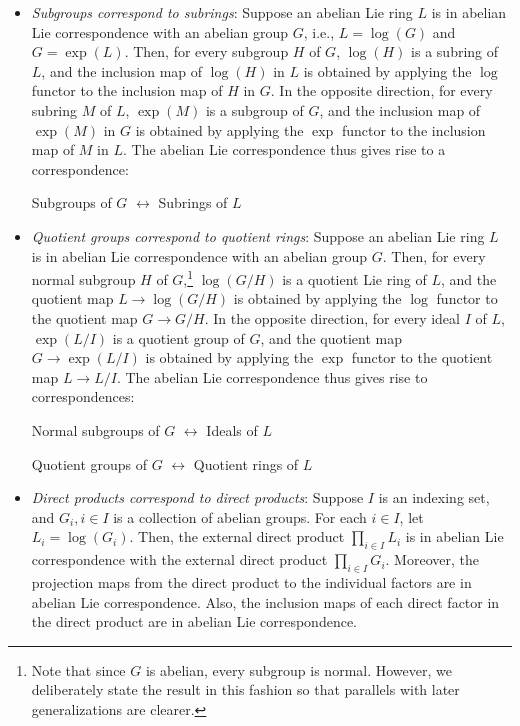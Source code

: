 \documentclass{ucetd}
\begin{document}
\begin{itemize}
\item {\em Subgroups correspond to subrings}: Suppose an abelian Lie
  ring $L$ is in abelian Lie correspondence with an abelian group $G$,
  i.e., $L = \log(G)$ and $G = \exp(L)$. Then, for every subgroup $H$
  of $G$, $\log(H)$ is a subring of $L$, and the inclusion map of
  $\log(H)$ in $L$ is obtained by applying the $\log$ functor to the
  inclusion map of $H$ in $G$. In the opposite direction, for every
  subring $M$ of $L$, $\exp(M)$ is a subgroup of $G$, and the
  inclusion map of $\exp(M)$ in $G$ is obtained by applying the $\exp$
  functor to the inclusion map of $M$ in $L$. The abelian Lie
  correspondence thus gives rise to a correspondence:

  \begin{center}
    Subgroups of $G$ $\leftrightarrow$ Subrings of $L$
  \end{center}

\item {\em Quotient groups correspond to quotient rings}: Suppose an
  abelian Lie ring $L$ is in abelian Lie correspondence with an
  abelian group $G$. Then, for every normal subgroup $H$ of
  $G$,\footnote{Note that since $G$ is abelian, every subgroup is
    normal. However, we deliberately state the result in this fashion
    so that parallels with later generalizations are clearer.}
  $\log(G/H)$ is a quotient Lie ring of $L$, and the quotient map $L
  \to \log(G/H)$ is obtained by applying the $\log$ functor to the
  quotient map $G \to G/H$. In the opposite direction, for every ideal
  $I$ of $L$, $\exp(L/I)$ is a quotient group of $G$, and the quotient
  map $G \to \exp(L/I)$ is obtained by applying the $\exp$ functor to
  the quotient map $L \to L/I$. The abelian Lie correspondence thus
  gives rise to correspondences:

  \begin{center}
    Normal subgroups of $G$ $\leftrightarrow$ Ideals of $L$
  \end{center}
  
  \begin{center}
    Quotient groups of $G$ $\leftrightarrow$ Quotient rings of $L$
  \end{center}

\item {\em Direct products correspond to direct products}: Suppose $I$
  is an indexing set, and $G_i, i \in I$ is a collection of abelian
  groups. For each $i \in I$, let $L_i = \log(G_i)$. Then, the
  external direct product $\prod_{i \in I} L_i$ is in abelian Lie
  correspondence with the external direct product $\prod_{i \in I}
  G_i$. Moreover, the projection maps from the direct product to the
  individual factors are in abelian Lie correspondence. Also, the
  inclusion maps of each direct factor in the direct product are in
  abelian Lie correspondence.
\end{itemize}
\end{document}
